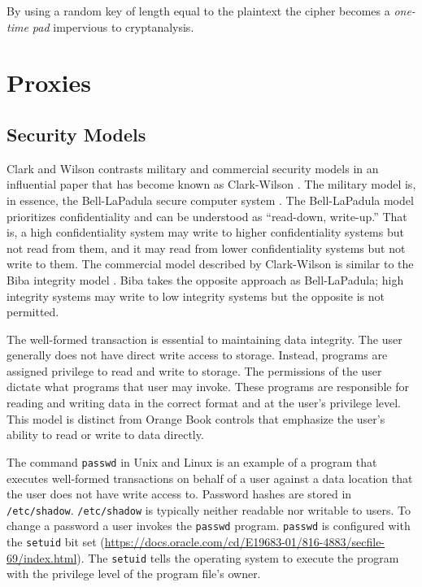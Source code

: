 \documentclass{book}
\begin{document}
By using a random key of length equal to the plaintext the cipher becomes a \textit{one-time pad} impervious to cryptanalysis.

\chapter{Proxies}

\section{Security Models}

Clark and Wilson contrasts military and commercial security models in an influential paper that has become known as Clark-Wilson \cite{clark-wilson}. The military model is, in essence, the Bell-LaPadula secure computer system \cite{bell1976secure}. The Bell-LaPadula model prioritizes confidentiality and can be understood as ``read-down, write-up.'' That is, a high confidentiality system may write to higher confidentiality systems but not read from them, and it may read from lower confidentiality systems but not write to them. The commercial model described by Clark-Wilson is similar to the Biba integrity model \cite{biba1977integrity}. Biba takes the opposite approach as Bell-LaPadula; high integrity systems may write to low integrity systems but the opposite is not permitted.

The well-formed transaction is essential to maintaining data integrity. The user generally does not have direct write access to storage. Instead, programs are assigned privilege to read and write to storage. The permissions of the user dictate what programs that user may invoke. These programs are responsible for reading and writing data in the correct format and at the user's privilege level. This model is distinct from Orange Book controls that emphasize the user's ability to read or write to data directly.

The command \texttt{passwd} in Unix and Linux is an example of a program that executes well-formed transactions on behalf of a user against a data location that the user does not have write access to. Password hashes are stored in \texttt{/etc/shadow}. \texttt{/etc/shadow} is typically neither readable nor writable to users. To change a password a user invokes the \texttt{passwd} program. \texttt{passwd} is configured with the \texttt{setuid} bit set (\url{https://docs.oracle.com/cd/E19683-01/816-4883/secfile-69/index.html}). The \texttt{setuid} tells the operating system to execute the program with the privilege level of the program file's owner.
\end{document}

